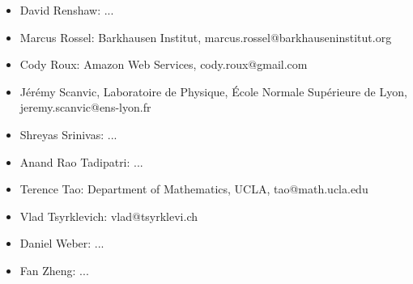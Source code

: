 \begin{itemize}
    \item David Renshaw: ...
    \item Marcus Rossel: Barkhausen Institut, marcus.rossel@barkhauseninstitut.org
    \item Cody Roux: Amazon Web Services, cody.roux@gmail.com
    \item J\'er\'emy Scanvic, Laboratoire de Physique, École Normale Supérieure de Lyon, jeremy.scanvic@ens-lyon.fr
    \item Shreyas Srinivas: ...
    \item Anand Rao Tadipatri: ...
    \item Terence Tao: Department of Mathematics, UCLA, tao@math.ucla.edu
    \item Vlad Tsyrklevich: vlad@tsyrklevi.ch
    \item Daniel Weber: ...
    \item Fan Zheng: ...

\end{itemize}
